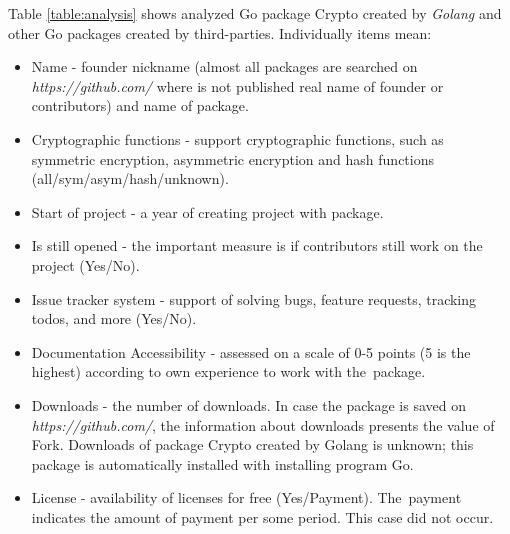 \documentclass[
  twoside, 12pt, 
  printed, %
  notable,   %
  lof,     %
  lot,     %
]{fithesis3}
\begin{document}
Table \ref{table:analysis} shows analyzed Go package Crypto created by \textit{Golang} and other Go 
packages created by third-parties. Individually items mean:
\vskip0.1in
\begin{itemize}[leftmargin=2em,rightmargin=1em,itemsep=0.75\parskip,parsep=0em,topsep=0em,partopsep=0em]
\item Name - founder nickname (almost all packages are searched on \textit{https://github.com/} where is not published real name of founder or contributors) and name of package.
\item Cryptographic functions - support cryptographic functions, such as symmetric encryption, asymmetric encryption and hash functions (all/sym/asym/hash/unknown).
\item Start of project - a year of creating project with package.
\item Is still opened - the important measure is if contributors still work on the project (Yes/No).
\item Issue tracker system - support of solving bugs, feature requests, tracking todos, and more (Yes/No).
\item Documentation Accessibility - assessed on a scale of 0-5 points (5 is the highest) according to own experience to work with the~package.
\item Downloads - the number of downloads. In case the package is saved on \textit{https://github.com/}, the information about downloads presents the value of Fork. Downloads of package Crypto created by Golang is unknown; this package is automatically installed with installing program Go.  
\item License - availability of licenses for free (Yes/Payment). The~payment indicates the amount of payment per some period. This case did not occur.
\end{itemize}
\vskip0.1in
\end{document}
